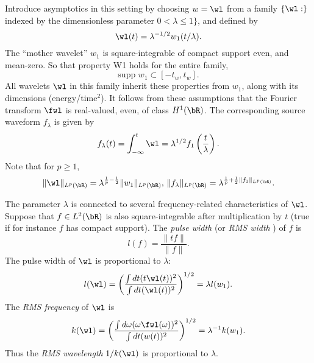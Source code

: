 Introduce asymptotics in this setting by choosing $w = \wl$
from a family $\{\wl:\}$ indexed by the dimensionless parameter
$0 <\lambda \le 1\}$, and defined by
\begin{equation}
  \label{eqn:wfam}
  \wl(t) = \lambda^{-1/2}w_1(t/\lambda).
\end{equation}
The  ``mother wavelet'' $w_1$ is square-integrable of compact support
even, and mean-zero. So that property W1 holds for the entire family, 
\begin{equation}
  \label{eqn:wdiam}
  \mbox{supp }w_1 \subset [-t_w,t_w].
\end{equation}
All wavelets $\wl$ in this family
inherit these properties from $w_1$, along with its dimensions
(energy/time$^2$). It follows from these assumptions that the Fourier transform $\fwl$ is
real-valued, even, of class $H^1(\bR)$. The corresponding source waveform $f_{\lambda}$ is
given by
\begin{equation}
  \label{eqn:flambda}
  f_{\lambda}(t) = \int_{-\infty}^t\wl =
  \lambda^{1/2}f_1\left(\frac{t}{\lambda}\right).
\end{equation}
Note that for $p \ge 1$,
\begin{equation}
  \label{eqn:lambdanorms}
  \|\wl\|_{L^p(\bR)} = \lambda ^{\frac{1}{p}-\frac{1}{2}}\|w_1\|_{L^p(\bR)},\,\|f_{\lambda}\|_{L^p(\bR)}
  = \lambda ^{\frac{1}{p}+\frac{1}{2} \|f_1\|_{L^p(\bR)}}.
\end{equation}


The parameter $\lambda$ is connected to several frequency-related
characteristics of $\wl$. Suppose that $f \in L^2(\bR)$ is also square-integrable after
multiplication by $t$ (true if  for instance $f$ has compact
support). The {\em pulse width} (or {\em RMS width} ) of $f$ is
\begin{equation}
  \label{eqn:pw}
  l(f) = \frac{\|tf\|}{\|f\|}.
\end{equation}
The pulse width of $\wl$ is proportional to $\lambda$:
\begin{equation}
  \label{eqn:wpw}
  l(\wl) = \left(\frac{\int dt (t \wl(t))^2}{\int dt (\wl(t))^2}
  \right)^{1/2} = \lambda l(w_1).
\end{equation}
The {\em RMS frequency} of $\wl$ is
\begin{equation}
  \label{eqn:freq}
  k(\wl) = \left(\frac{\int d\omega (\omega \fwl(\omega))^2}{\int dt (w(t))^2} \right)^{1/2} = \lambda^{-1}k(w_1).
\end{equation}
Thus the {\em RMS wavelength} $1/k(\wl)$ is proportional to $\lambda$.

